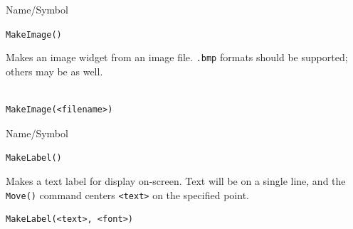 \begin{desc}{Name/Symbol}
\item[Name/Symbol]	\verb+MakeImage()+

\item[Description]	Makes an image widget from an image file.
		\texttt{.bmp} formats should be supported; others may be as well.

\item[Usage]		
\begin{verbatim}

MakeImage(<filename>)
\end{verbatim}

\item[Example]	

\item[See Also]	
\end{desc}



\begin{desc}{Name/Symbol}
\item[Name/Symbol]	\verb+MakeLabel()+

\item[Description] Makes a text label for display on-screen. Text will
  be on a single line, and the \verb+Move()+ command centers
  \verb+<text>+ on the specified point.

\item[Usage]
\begin{verbatim}
MakeLabel(<text>, <font>)
\end{verbatim}

\item[Example]	

\item[See Also]	
\end{desc}



